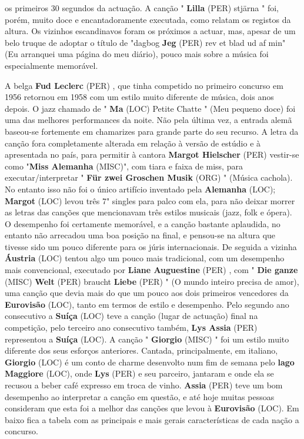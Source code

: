 \documentclass[12pt,a4paper]{article}
\begin{document}
os primeiros 30 segundos da actuação. A canção " \textbf{Lilla} (PER) stjärna " foi, porém, muito doce e encantadoramente executada, como relatam os registos da altura. Os vizinhos escandinavos foram os próximos a actuar, mas, apesar de um belo truque de adoptar o título de "dagbog \textbf{Jeg} (PER) rev et blad ud af min" (Eu arranquei uma página do meu diário), pouco mais sobre a música foi especialmente memorável.

A belga \textbf{Fud Leclerc} (PER) , que tinha competido no primeiro concurso em 1956 retornou em 1958 com um estilo muito diferente de música, dois anos depois. O jazz chamado de " \textbf{Ma} (LOC) Petite Chatte " (Meu pequeno doce) foi uma das melhores performances da noite. Não pela última vez, a entrada alemã baseou-se fortemente em chamarizes para grande parte do seu recurso. A letra da canção fora completamente alterada em relação à versão de estúdio e à apresentada no país, para permitir à cantora \textbf{Margot Hielscher} (PER) vestir-se como "\textbf{Miss Alemanha} (MISC)", com tiara e faixa de miss, para executar/interpretar " \textbf{Für zwei Groschen Musik} (ORG) " (Música cachola). No entanto isso não foi o único artifício inventado pela \textbf{Alemanha} (LOC); \textbf{Margot} (LOC) levou três 7" singles para palco com ela, para não deixar morrer as letras das canções que mencionavam três estilos musicais (jazz, folk e ópera). O desempenho foi certamente memorável, e a canção bastante aplaudida, no entanto não arrecadou uma boa posição na final, e pensou-se na altura que tivesse sido um pouco diferente para os júris internacionais. De seguida a vizinha \textbf{Áustria} (LOC) tentou algo um pouco mais tradicional, com um desempenho mais convencional, executado por \textbf{Liane Auguestine} (PER) , com " \textbf{Die ganze} (MISC) \textbf{Welt} (PER) braucht \textbf{Liebe} (PER) " (O mundo inteiro precisa de amor), uma canção que devia mais do que um pouco aos dois primeiros vencedores da \textbf{Eurovisão} (LOC), tanto em termos de estilo e desempenho. Pelo segundo ano consecutivo a \textbf{Suíça} (LOC) teve a canção (lugar de actuação) final na competição, pelo terceiro ano consecutivo também, \textbf{Lys Assia} (PER) representou a \textbf{Suíça} (LOC). A canção " \textbf{Giorgio} (MISC) " foi um estilo muito diferente dos seus esforços anteriores. Cantada, principalmente, em italiano, \textbf{Giorgio} (LOC) é um conto de charme desenvolto num fim de semana pelo \textbf{lago Maggiore} (LOC), onde \textbf{Lys} (PER) e seu parceiro, jantaram e onde ela se recusou a beber café expresso em troca de vinho. \textbf{Assia} (PER) teve um bom desempenho ao interpretar a canção em questão, e até hoje muitas pessoas consideram que esta foi a melhor das canções que levou à \textbf{Eurovisão} (LOC). Em baixo fica a tabela com as principais e mais gerais características de cada nação a concurso.
\end{document}
